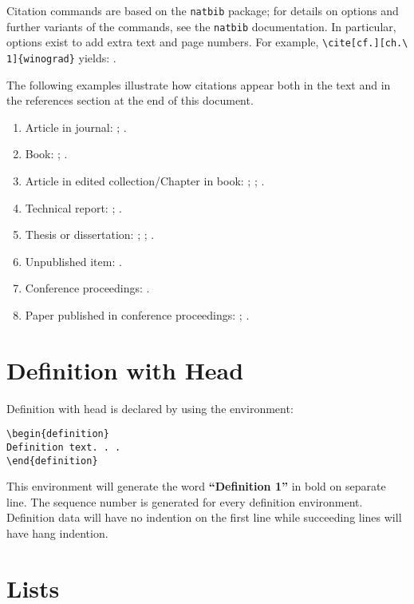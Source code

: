 \documentclass{clv3}
\begin{document}
Citation commands are based on the \verb|natbib| package;
for details on options and further variants of the commands,
see the \verb|natbib| documentation.  In particular, options 
exist to add extra text and page numbers.  For example, 
\verb|\cite[cf.][ch.\ 1]{winograd}| yields: \cite[cf.][ch.\ 1]{winograd}.

The following examples illustrate how citations appear both in the text
and in the references section at the end of this document.
\begin{enumerate}
\item Article in journal: 
 ;
 .
\item Book: 
  ;
  .
\item Article in edited collection/Chapter in book: 
  ;
  ;
  .
\item Technical report:
  ;
  .
\item Thesis or dissertation: 
  ;
  ;
  .
\item Unpublished item: 
  .
\item Conference proceedings: 
  .
\item Paper published in conference proceedings: 
  ;
  .
\end{enumerate}


\section{Definition with Head}

Definition with head is declared by using the environment:
\\
\begin{verbatim}
\begin{definition}
Definition text. . .
\end{definition}
\end{verbatim}

This environment will generate the word {\bf ``Definition 1''} in bold on separate
line. The sequence number is generated for every definition environment. Definition 
data will have no indention on the first line while succeeding lines will have hang 
indention.

\section{Lists}
\end{document}
